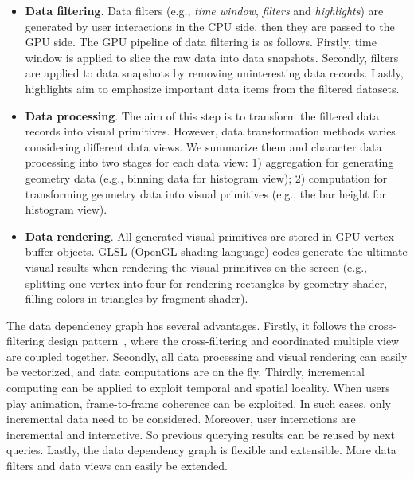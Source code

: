 \begin{itemize}
	\item \textbf{Data filtering}. Data filters (e.g., \textsl{time window}, \textsl{filters} and \textsl{highlights}) are generated by user interactions in the CPU side, then they are passed to the GPU side.  The GPU pipeline of data filtering is as follows. Firstly,  time window is applied to slice the raw data into data snapshots. Secondly,  filters are applied to data snapshots by removing uninteresting data records. Lastly, highlights  aim to emphasize important data items from the filtered datasets.  
	\item \textbf{Data processing}. The aim of this step is to transform the filtered data records into visual primitives. However, data transformation methods varies considering different data views. We summarize them and character data processing into two stages for each data view: 1) aggregation for generating geometry data (e.g., binning data for histogram view); 2) computation for transforming geometry data into visual primitives  (e.g., the bar height for histogram view).
	\item \textbf{Data rendering}. All generated visual primitives are stored in GPU vertex buffer objects. GLSL (OpenGL shading language) codes generate the ultimate visual results when rendering the visual primitives on the screen (e.g.,  splitting one vertex into four for rendering rectangles by geometry shader,  filling colors in triangles by fragment shader). 
\end{itemize}	
 

 


The data dependency graph has several advantages. Firstly, it follows the cross-filtering design pattern~\cite{weaver2010cross}, where the cross-filtering and coordinated multiple view are coupled together.
Secondly, all data processing and visual rendering can easily be vectorized, and data computations are on the fly. Thirdly,  incremental computing can be applied to exploit temporal and spatial locality. When users play animation, frame-to-frame coherence can be exploited. In such cases, only incremental data need to be considered. Moreover, user interactions are  incremental and interactive. So previous querying results can be reused by next queries. Lastly, the data dependency graph is flexible and extensible. More data filters and data views can easily be extended.


~~~~~~~~~~~~~~~~  


